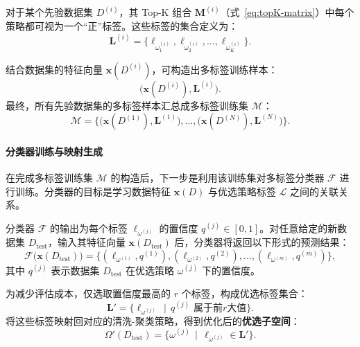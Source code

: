\documentclass[10pt]{article} %
\numberwithin{equation}{section}
\begin{document}
对于某个先验数据集 $D^{(i)}$，其 Top-K 组合 $\mathbf{M}^{(i)}$（式~\eqref{eq:topK-matrix}）中每个策略都可视为一个“正”标签。这些标签的集合定义为：
\begin{equation}\label{eq:label-space-for-D}
\mathbf{L}^{(i)}
= \{\ell_{\omega_1^{(i)}}, \ell_{\omega_2^{(i)}}, \ldots, \ell_{\omega_K^{(i)}}\}.
\end{equation}

结合数据集的特征向量 $\mathbf{x}(D^{(i)})$，可构造出多标签训练样本：
\[
\bigl(\mathbf{x}(D^{(i)}), \mathbf{L}^{(i)}\bigr).
\]
最终，所有先验数据集的多标签样本汇总成多标签训练集 $\mathcal{M}$：
\begin{equation}\label{eq:training-set}
\mathcal{M}
= \bigl\{\bigl(\mathbf{x}(D^{(1)}), \mathbf{L}^{(1)}\bigr), \ldots, \bigl(\mathbf{x}(D^{(N)}), \mathbf{L}^{(N)}\bigr)\bigr\}.
\end{equation}

\paragraph{分类器训练与映射生成}  
在完成多标签训练集 $\mathcal{M}$ 的构造后，下一步是利用该训练集对多标签分类器 $\mathcal{F}$ 进行训练。分类器的目标是学习数据特征 $\mathbf{x}(D)$ 与优选策略标签 $\mathcal{L}$ 之间的关联关系。

分类器 $\mathcal{F}$ 的输出为每个标签 $\ell_{\omega^{(j)}}$ 的置信度 $q^{(j)} \in [0,1]$。对任意给定的新数据集 $D_{\text{test}}$，输入其特征向量 $\mathbf{x}(D_{\text{test}})$ 后，分类器将返回以下形式的预测结果：
\begin{equation}\label{eq:classifier}
\mathcal{F}\bigl(\mathbf{x}(D_{\text{test}})\bigr)
= \bigl\{(\ell_{\omega^{(1)}}, q^{(1)}), (\ell_{\omega^{(2)}}, q^{(2)}), \ldots, (\ell_{\omega^{(m)}}, q^{(m)})\bigr\},
\end{equation}
其中 $q^{(j)}$ 表示数据集 $D_{\text{test}}$ 在优选策略 $\omega^{(j)}$ 下的置信度。

为减少评估成本，仅选取置信度最高的 $r$ 个标签，构成优选标签集合：
\begin{equation}\label{eq:predicted-label-space}
\mathbf{L}' = \bigl\{\ell_{\omega^{(j)}} \,\mid\, q^{(j)} \text{ 属于前}r\text{大值}\bigr\}.
\end{equation}
将这些标签映射回对应的清洗-聚类策略，得到优化后的\textbf{优选子空间}：
\begin{equation}\label{eq:optimized-space}
\Omega'(D_{\text{test}})
= \bigl\{\omega^{(j)} \,\mid\, \ell_{\omega^{(j)}} \in \mathbf{L}'\bigr\}.
\end{equation}
\end{document}
